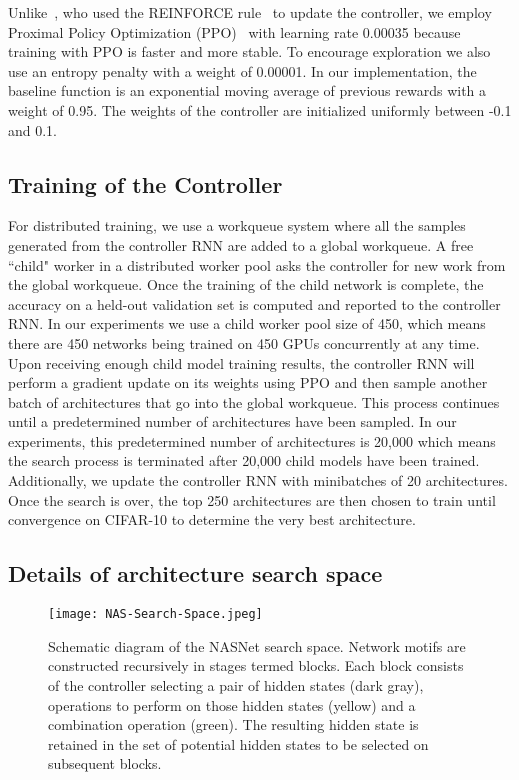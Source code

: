 \documentclass[10pt,twocolumn,letterpaper]{article}
\begin{document}
Unlike~\cite{zoph2017neural}, who used the REINFORCE rule~\cite{Williams92simplestatistical} to update the controller, we employ Proximal Policy Optimization (PPO)~\cite{SchulmanWDRK17} with learning rate 0.00035 because training with PPO is faster and more stable. To encourage exploration we also use an entropy penalty with a weight of 0.00001. In our implementation, the baseline function is an exponential moving average of previous rewards with a weight of 0.95. The weights of the controller are initialized uniformly between -0.1 and 0.1.

\subsection{Training of the Controller}
For distributed training, we use a workqueue system where all the samples generated from the controller RNN are added to a global workqueue. A free ``child" worker in a distributed worker pool asks the controller for new work from the global workqueue. Once the training of the child network is complete, the accuracy on a held-out validation set is computed and reported to the controller RNN. In our experiments we use a child worker pool size of 450, which means there are 450 networks being trained on 450 GPUs concurrently at any time. Upon receiving enough child model training results, the controller RNN will perform a gradient update on its weights using PPO and then sample another batch of architectures that go into the global workqueue. This process continues until a predetermined number of architectures have been sampled. In our experiments, this predetermined number of architectures is 20,000 which means the search process is terminated after 20,000 child models have been trained. Additionally, we update the controller RNN with minibatches of 20 architectures. Once the search is over, the top 250 architectures are then chosen to train until convergence on CIFAR-10 to determine the very best architecture.

\subsection{Details of architecture search space}\begin{figure*}[t]
\begin{center}
\texttt{[image: NAS-Search-Space.jpeg]}
\caption{Schematic diagram of the NASNet search space. Network motifs are constructed recursively in stages termed blocks. Each block consists of the controller selecting a pair of hidden states (dark gray), operations to perform on those hidden states (yellow) and a combination operation (green). The resulting hidden state is retained in the set of potential hidden states to be selected on subsequent blocks.}
\label{figure:nas-search-space}
\end{center}
\end{figure*}
\end{document}
